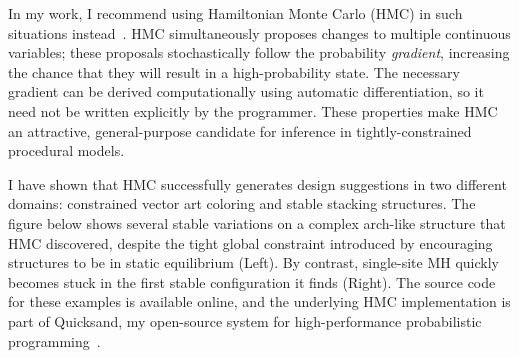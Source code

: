\documentclass[
10pt, %
a4paper, %
oneside, %
headinclude,footinclude, %
BCOR5mm, %
]{scrartcl}
\begin{document}
In my work, I recommend using Hamiltonian Monte Carlo (HMC) in such situations instead~\cite{GraphicsHMC}. HMC simultaneously proposes changes to multiple continuous variables; these proposals stochastically follow the probability \emph{gradient}, increasing the chance that they will result in a high-probability state. The necessary gradient can be derived computationally using automatic differentiation, so it need not be written explicitly by the programmer. These properties make HMC an attractive, general-purpose candidate for inference in tightly-constrained procedural models.

I have shown that HMC successfully generates design suggestions in two different domains: constrained vector art coloring and stable stacking structures. The figure below shows several stable variations on a complex arch-like structure that HMC discovered, despite the tight global constraint introduced by encouraging structures to be in static equilibrium (Left). By contrast, single-site MH quickly becomes stuck in the first stable configuration it finds (Right). The source code for these examples is available online, and the underlying HMC implementation is part of Quicksand, my open-source system for high-performance probabilistic programming~\cite{Quicksand}.
\end{document}
